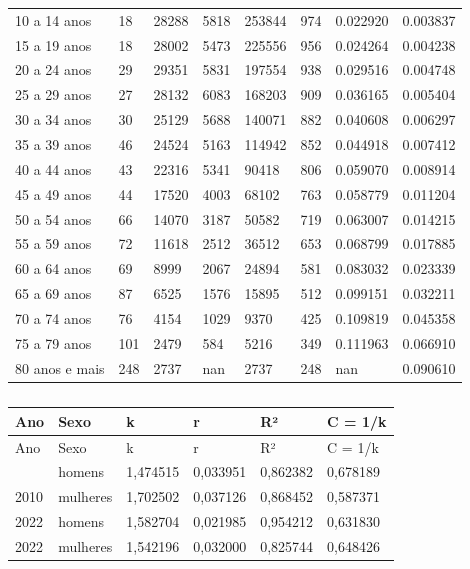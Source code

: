 \documentclass[
  12pt,
  a4paper,
]{scrreprt}
\begin{document}
\begin{longtable}[]{@{}llllllll@{}}
10 a 14 anos & 18 & 28288 & 5818 & 253844 & 974 & 0.022920 & 0.003837 \\
15 a 19 anos & 18 & 28002 & 5473 & 225556 & 956 & 0.024264 & 0.004238 \\
20 a 24 anos & 29 & 29351 & 5831 & 197554 & 938 & 0.029516 & 0.004748 \\
25 a 29 anos & 27 & 28132 & 6083 & 168203 & 909 & 0.036165 & 0.005404 \\
30 a 34 anos & 30 & 25129 & 5688 & 140071 & 882 & 0.040608 & 0.006297 \\
35 a 39 anos & 46 & 24524 & 5163 & 114942 & 852 & 0.044918 & 0.007412 \\
40 a 44 anos & 43 & 22316 & 5341 & 90418 & 806 & 0.059070 & 0.008914 \\
45 a 49 anos & 44 & 17520 & 4003 & 68102 & 763 & 0.058779 & 0.011204 \\
50 a 54 anos & 66 & 14070 & 3187 & 50582 & 719 & 0.063007 & 0.014215 \\
55 a 59 anos & 72 & 11618 & 2512 & 36512 & 653 & 0.068799 & 0.017885 \\
60 a 64 anos & 69 & 8999 & 2067 & 24894 & 581 & 0.083032 & 0.023339 \\
65 a 69 anos & 87 & 6525 & 1576 & 15895 & 512 & 0.099151 & 0.032211 \\
70 a 74 anos & 76 & 4154 & 1029 & 9370 & 425 & 0.109819 & 0.045358 \\
75 a 79 anos & 101 & 2479 & 584 & 5216 & 349 & 0.111963 & 0.066910 \\
80 anos e mais & 248 & 2737 & nan & 2737 & 248 & nan & 0.090610 \\
\end{longtable}

\begin{longtable}[]{@{}llllll@{}}
\caption{}\label{T_3d0b9}\tabularnewline
\toprule\noalign{}
Ano & Sexo & k & r & R² & C = 1/k \\
\midrule\noalign{}
\endfirsthead
\toprule\noalign{}
Ano & Sexo & k & r & R² & C = 1/k \\
\midrule\noalign{}
\endhead
\bottomrule\noalign{}
\endlastfoot
2010 & homens & 1,474515 & 0,033951 & 0,862382 & 0,678189 \\
2010 & mulheres & 1,702502 & 0,037126 & 0,868452 & 0,587371 \\
2022 & homens & 1,582704 & 0,021985 & 0,954212 & 0,631830 \\
2022 & mulheres & 1,542196 & 0,032000 & 0,825744 & 0,648426 \\
\end{longtable}
\end{document}
